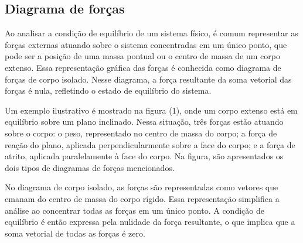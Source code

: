 \documentclass[12pt, letterpaper]{article}
\begin{document}
\subsection{Diagrama de forças}

Ao analisar a condição de equilíbrio de um sistema físico, é comum representar as forças externas atuando sobre o sistema concentradas em um único ponto, que pode ser a posição de uma massa pontual ou o centro de massa de um corpo extenso. Essa representação gráfica das forças é conhecida como diagrama de forças de corpo isolado. Nesse diagrama, a força resultante da soma vetorial das forças é nula, refletindo o estado de equilíbrio do sistema.

Um exemplo ilustrativo é mostrado na figura (1), onde um corpo extenso está em equilíbrio sobre um plano inclinado. Nessa situação, três forças estão atuando sobre o corpo: o peso, representado no centro de massa do corpo; a força de reação do plano, aplicada perpendicularmente sobre a face do corpo; e a força de atrito, aplicada paralelamente à face do corpo. Na figura, são apresentados os dois tipos de diagramas de forças mencionados.

No diagrama de corpo isolado, as forças são representadas como vetores que emanam do centro de massa do corpo rígido. Essa representação simplifica a análise ao concentrar todas as forças em um único ponto. A condição de equilíbrio é então expressa pela nulidade da força resultante, o que implica que a soma vetorial de todas as forças é zero.
\end{document}
